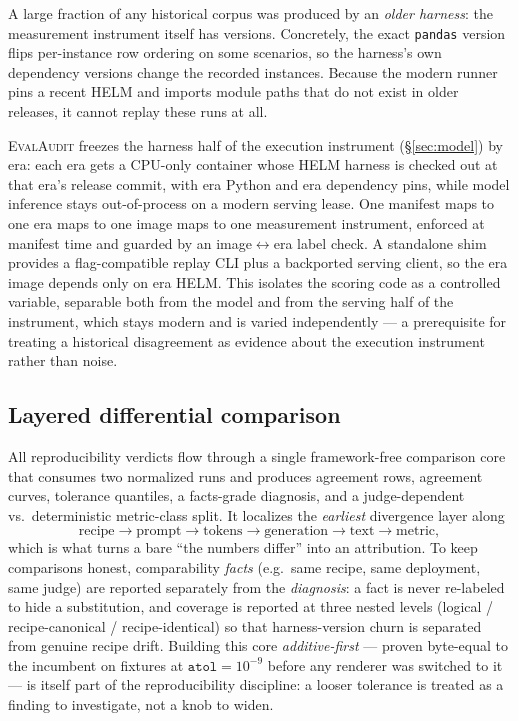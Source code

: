 A large fraction of any historical corpus was produced by an \emph{older harness}:
the measurement instrument itself has versions. Concretely, the exact
\texttt{pandas} version flips per-instance row ordering on some scenarios, so the
harness's own dependency versions change the recorded instances. Because the
modern runner pins a recent HELM and imports module paths that do not exist in
older releases, it cannot replay these runs at all.

\textsc{EvalAudit} freezes the harness half of the execution instrument
(\S\ref{sec:model}) by era: each era gets a CPU-only
container whose HELM harness is checked out at that era's release commit, with
era Python and era dependency pins, while model inference stays out-of-process on
a modern serving lease. One manifest maps to one era maps to one image maps to one
measurement instrument, enforced at manifest time and guarded by an
image$\leftrightarrow$era label check. A standalone shim provides a
flag-compatible replay CLI plus a backported serving client, so the era image
depends only on era HELM. This isolates the scoring code as a controlled
variable, separable both from the model and from the serving half of the
instrument, which stays modern and is varied independently --- a prerequisite for
treating a historical disagreement as evidence about the execution instrument
rather than noise.

\subsection{Layered differential comparison}
\label{sec:diff}

All reproducibility verdicts flow through a single framework-free comparison core
that consumes two normalized runs and produces agreement rows, agreement curves,
tolerance quantiles, a facts-grade diagnosis, and a judge-dependent vs.\
deterministic metric-class split. It localizes the \emph{earliest} divergence
layer along
\[
\text{recipe} \rightarrow \text{prompt} \rightarrow \text{tokens} \rightarrow
\text{generation} \rightarrow \text{text} \rightarrow \text{metric},
\]
which is what turns a bare ``the numbers differ'' into an attribution. To keep
comparisons honest, comparability \emph{facts} (e.g.\ same recipe, same
deployment, same judge) are reported separately from the \emph{diagnosis}: a fact
is never re-labeled to hide a substitution, and coverage is reported
at three nested levels (logical / recipe-canonical / recipe-identical) so that
harness-version churn is separated from genuine recipe drift. Building this core
\emph{additive-first} --- proven byte-equal to the incumbent on fixtures at
$\texttt{atol}=10^{-9}$ before any renderer was switched to it --- is itself part of
the reproducibility discipline: a looser tolerance is treated as a finding to
investigate, not a knob to widen.
